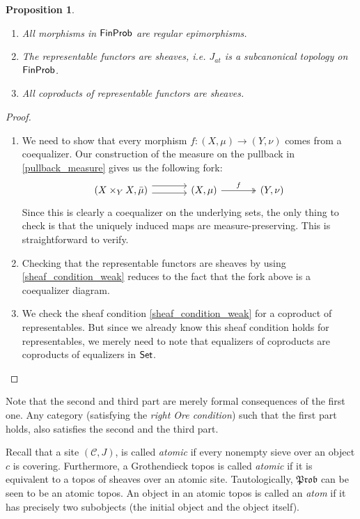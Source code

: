\documentclass[a4paper]{amsproc}
\theoremstyle{plain}
\newtheorem{proposition}[theorem]{Proposition}
\theoremstyle{definition}
\theoremstyle{remark}
\numberwithin{equation}{section}
\newcommand{\Set}{\textup{\textsf{Set}}}
\newcommand{\FinProb}{\textup{\textsf{FinProb}}}
\newcommand{\C}{\mathcal{C}}
\newcommand{\Prob}{\mathfrak{Prob}}
\begin{document}
\begin{proposition}\label{subcanonical}
    \mbox{}
    \begin{enumerate}
        \item All morphisms in $\FinProb$ are regular epimorphisms.
        \item The representable functors are sheaves, i.e. $J_{at}$ is a subcanonical topology on $\FinProb$.
        \item All coproducts of representable functors are sheaves.
    \end{enumerate}
\end{proposition}
\begin{proof}
    \mbox{}
    \begin{enumerate}
        \item We need to show that every morphism $f:(X,\mu)\rightarrow (Y, \nu)$ comes from a coequalizer. Our construction of the measure on the pullback in \ref{pullback_measure} gives us the following fork:
        \[
        \begin{tikzcd}[column sep=large]
        (X \times_Y X, \bar{\mu}) \arrow[r, shift left=2] \arrow[r, shift right] & (X,\mu) \arrow[r, "f", two heads] & (Y,\nu)
        \end{tikzcd}
        \]
        Since this is clearly a coequalizer on the underlying sets, the only thing to check is that the uniquely induced maps are measure-preserving. This is straightforward to verify.

        \item Checking that the representable functors are sheaves by using \ref{sheaf_condition_weak} reduces to the fact that the fork above is a coequalizer diagram.

        \item We check the sheaf condition \ref{sheaf_condition_weak} for a coproduct of representables. But since we already know this sheaf condition holds for representables, we merely need to note that equalizers of coproducts are coproducts of equalizers in $\Set$.
    \end{enumerate}
\end{proof}

Note that the second and third part are merely formal consequences of the first one. Any category (satisfying the \emph{right Ore condition}) such that the first part holds, also satisfies the second and the third part.

Recall that a site $(\C, J)$, is called \emph{atomic} if every nonempty sieve over an object $c$ is covering. Furthermore, a Grothendieck topos is called \emph{atomic} if it is equivalent to a topos of sheaves over an atomic site. Tautologically, $\Prob$ can be seen to be an atomic topos. An object in an atomic topos is called an \emph{atom} if it has precisely two subobjects (the initial object and the object itself).
\end{document}
